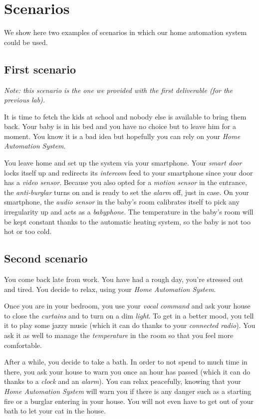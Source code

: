 	\section{Scenarios}
		We show here two examples of scenarios in which our home automation system could be used.
		
		\subsection{First scenario}
			\textit{Note: this scenario is the one we provided with the first deliverable (for the previous lab).}

			It is time to fetch the kids at school and nobody else is available to bring them back. Your baby is in his bed and you have no choice but to leave him for a moment. You know it is a bad idea but hopefully you can rely on your \emph{Home Automation System}.

      		You leave home and set up the system via your smartphone.
      		Your \emph{smart door} locks itself up and redirects its \emph{intercom} feed to your smartphone since your door has a \emph{video sensor}. Because you also opted for a \emph{motion sensor} in the entrance, the \emph{anti-burglar} turns on and is ready to set the \emph{alarm} off, just in case.
      		On your smartphone, the \emph{audio sensor} in the baby's room calibrates itself to pick any irregularity up and acts as a \emph{babyphone}. The temperature in the baby's room will be kept constant thanks to the automatic heating system, so the baby is not too hot or too cold.

		\subsection{Second scenario}
			You come back late from work. You have had a rough day, you're stressed out and tired. You decide to relax, using your \emph{Home Automation System}.

			Once you are in your bedroom, you use your \emph{vocal command} and ask your house to close the \emph{curtains} and to turn on a dim \emph{light}. To get in a better mood, you tell it to play some jazzy music (which it can do thanks to your \emph{connected radio}). You ask it as well to manage the \emph{temperature} in the room so that you feel more comfortable.

			After a while, you decide to take a bath. In order to not spend to much time in there, you ask your house to warn you once an hour has passed (which it can do thanks to a \emph{clock} and an \emph{alarm}).
			You can relax peacefully, knowing that your \emph{Home Automation System} will warn you if there is any danger such as a starting fire or a burglar entering in your house. You will not even have to get out of your bath to let your cat in the house.

